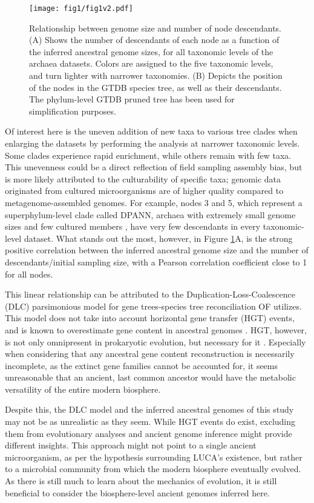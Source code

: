 \begin{figure}[H]
    \centering
    \texttt{[image: fig1/fig1v2.pdf]}
    \caption{Relationship between genome size and number of node descendants. (A) Shows the number of descendants of each node as a function of the inferred ancestral genome sizes, for all taxonomic levels of the archaea datasets. Colors are assigned to the five taxonomic levels, and turn lighter with narrower taxonomies. (B) Depicts the position of the nodes in the GTDB species tree, as well as their descendants. The phylum-level GTDB pruned tree has been used for simplification purposes. }
    \label{node_descendants_genomesize}
\end{figure}   

Of interest here is the uneven addition of new taxa to various tree clades when enlarging the datasets by performing the analysis at narrower taxonomic levels. Some clades experience rapid enrichment, while others remain with few taxa. This unevenness could be a direct reflection of field sampling assembly bias, but is more likely attributed to the culturability of specific taxa; genomic data originated from cultured microorganisms are of higher quality compared to metagenome-assembled genomes. For example, nodes 3 and 5, which represent a superphylum-level clade called DPANN, archaea with extremely small genome sizes and few cultured members \cite{dombrowski2019, dombrowski2020}, have very few descendants in every taxonomic-level dataset. What stands out the most, however, in Figure \ref{node_descendants_genomesize}A, is the strong positive correlation between the inferred ancestral genome size and the number of descendants/initial sampling size, with a Pearson correlation coefficient close to 1 for all nodes. 

This linear relationship can be attributed to the Duplication-Loss-Coalescence (DLC) parsimonious model for gene trees-species tree reconciliation OF utilizes. This model does not take into account horizontal gene transfer (HGT) events, and is known to overestimate gene content in ancestral genomes \cite{doolittle2003}. HGT, however, is not only omnipresent in prokaryotic evolution, but necessary for it \cite{ochman2000}. Especially when considering that any ancestral gene content reconstruction is necessarily incomplete, as the extinct gene families cannot be accounted for, it seems unreasonable that an ancient, last common ancestor would have the metabolic versatility of the entire modern biosphere. 

Despite this, the DLC model and the inferred ancestral genomes of this study may not be as unrealistic as they seem. While HGT events do exist, excluding them from evolutionary analyses and ancient genome inference might provide different insights. This approach might not point to a single ancient microorganism, as per the hypothesis surrounding LUCA's existence, but rather to a microbial community from which the modern biosphere eventually evolved. As there is still much to learn about the mechanics of evolution, it is still beneficial to consider the biosphere-level ancient genomes inferred here.

